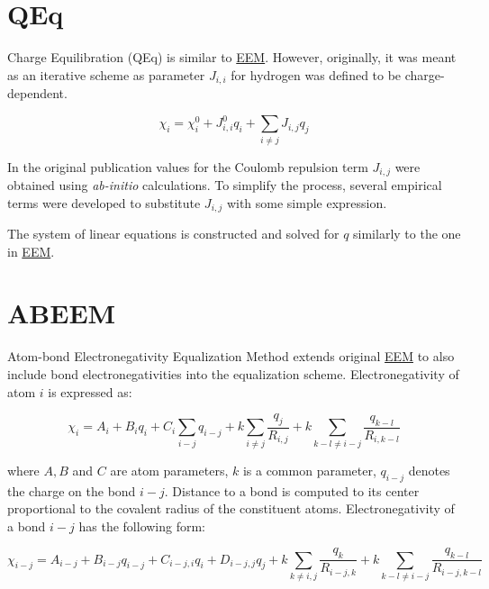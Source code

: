 \documentclass[oneside]{memoir}
\newcommand\ddfrac[2]{\frac{\displaystyle #1}{\displaystyle #2}}
\begin{document}
\section*{QEq}
\label{sec:methods_qeq}

Charge Equilibration (QEq) \cite{Rappe1991} is similar to \hyperref[sec:methods_eem]{EEM}. However, originally, it was meant as an iterative scheme as parameter $J_{i, i}$ for hydrogen was defined to be charge-dependent.

\begin{equation}
\label{eq:qeq_main}
\chi_i = \chi_i^0 + J_{i, i}^0q_i + \sum_{i \neq j} J_{i,j}q_j
\end{equation}

In the original publication values for the Coulomb repulsion term $J_{i, j}$ were obtained using \textit{ab-initio} calculations. To simplify the process, several empirical terms were developed to substitute $J_{i, j}$ with some simple expression.

The system of linear equations is constructed and solved for $q$ similarly to the one in \hyperref[eq:eem_system]{EEM}.

\section*{ABEEM}
\label{sec:methods_abeem}

Atom-bond Electronegativity Equalization Method \cite{Yang1997} extends original \hyperref[sec:methods_eem]{EEM} to also include bond electronegativities into the equalization scheme. Electronegativity of atom $i$ is expressed as:

\begin{equation}
\label{eq:abeem_atom}
\chi_i = A_i + B_iq_i + C_i\sum_{i-j}q_{i-j} + k\sum_{i \neq j}\ddfrac{q_j}{R_{i, j}} + k \sum_{k-l \neq i-j}\ddfrac{q_{k-l}}{R_{i, k-l}}
\end{equation}

where $A, B$ and $C$ are atom parameters, $k$ is a common parameter, $q_{i-j}$ denotes the charge on the bond $i-j$. Distance to a bond is computed to its center proportional to the covalent radius of the constituent atoms. Electronegativity of a bond $i-j$ has the following form:

\begin{equation}
\label{eq:abeem_bond}
\chi_{i-j} = A_{i-j} + B_{i-j}q_{i-j} + C_{i-j, i}q_i + D_{i-j, j}q_j + k\sum_{k\neq i, j}\ddfrac{q_k}{R_{i-j, k}} + k\sum_{k-l\neq i-j}\ddfrac{q_{k-l}}{R_{i-j,k-l}}
\end{equation}
\end{document}
